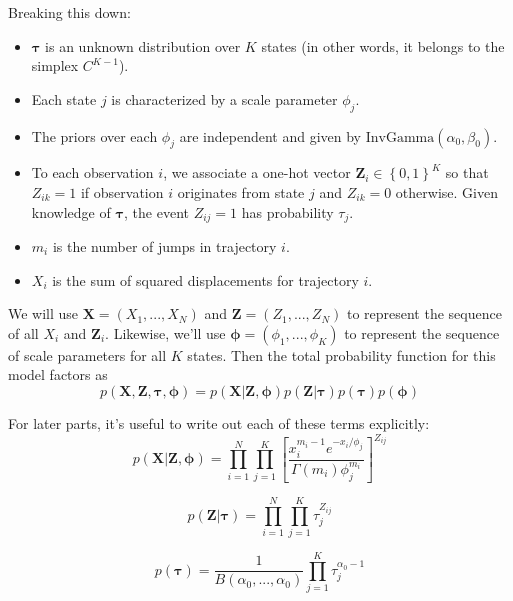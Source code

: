 \documentclass{article}
\let\vec\boldsymbol
\begin{document}
Breaking this down:
\begin{itemize}
    \item $\boldsymbol{\tau}$ is an unknown distribution over $K$ states (in other words, it belongs to the simplex $C^{K-1}$).
    \item Each state $j$ is characterized by a scale parameter $\phi_{j}$.
    \item The priors over each $\phi_{j}$ are independent and given by $\text{InvGamma} (\alpha_{0}, \beta_{0})$.
    \item To each observation $i$, we associate a one-hot vector $\vec{Z}_{i} \in \left\{ 0, 1 \right\}^{K}$ so that $Z_{ik} = 1$ if observation $i$ originates from state $j$ and $Z_{ik} = 0$ otherwise. Given knowledge of $\boldsymbol{\tau}$, the event $Z_{ij} = 1$ has probability $\tau_{j}$.
    \item $m_{i}$ is the number of jumps in trajectory $i$.
    \item $X_{i}$ is the sum of squared displacements for trajectory $i$.
\end{itemize}

We will use $\vec{X} = \left( X_{1}, ..., X_{N} \right)$ and
$\vec{Z} = \left( Z_{1}, ..., Z_{N} \right)$ to represent the sequence of
all $X_{i}$ and $\vec{Z}_{i}$.
Likewise, we'll use $\boldsymbol{\phi} = (\phi_{1}, ..., \phi_{K})$ to represent the sequence of scale parameters for all $K$ states.
Then the total probability function for this model factors as
\[
    p \left( \vec{X}, \vec{Z}, \boldsymbol{\tau}, \boldsymbol{\phi} \right) = p \left( \vec{X} | \vec{Z}, \boldsymbol{\phi} \right) p \left( \vec{Z} | \boldsymbol{\tau} \right) p \left( \boldsymbol{\tau} \right) p \left( \boldsymbol{\phi} \right)
\]

For later parts, it's useful to write out each of these terms explicitly:
\begin{equation}\label{eq:eqA}
    p \left( \vec{X} | \vec{Z}, \boldsymbol{\phi} \right) = \prod\limits_{i=1}^{N} \prod\limits_{j=1}^{K} \left[
        \frac{ x_{i}^{m_{i}-1} e^{-x_{i} / \phi_{j}}}{\Gamma (m_{i}) \phi_{j}^{m_{i}}}
    \right]^{Z_{ij}}
\end{equation}

\begin{equation}\label{eq:eqB}
    p \left( \vec{Z} | \boldsymbol{\tau} \right) = \prod\limits_{i=1}^{N} \prod\limits_{j=1}^{K} \tau_{j}^{Z_{ij}}
\end{equation}

\begin{equation}\label{eq:eqC}
    p \left( \boldsymbol{\tau} \right) = \frac{1}{B(\alpha_{0}, ..., \alpha_{0})} \prod\limits_{j=1}^{K} \tau_{j}^{\alpha_{0} - 1}
\end{equation}
\end{document}
